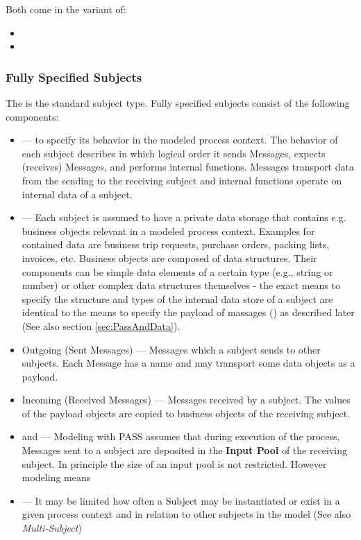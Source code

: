 Both come in the variant of:

\begin{itemize}
    \item {}
	\item {}
\end{itemize}

\subsubsection{Fully Specified Subjects}
\label{sec:fullySpecifiedSubject}

The  is the standard subject type. Fully specified subjects consist of the following components:

\begin{itemize}
    \item {} --- to specify its behavior in the modeled process context. The behavior of each subject describes in which logical order it sends Messages, expects (receives) Messages, and performs internal functions. Messages transport data from the sending to the receiving subject and internal functions operate on internal data of a subject. 
	\item {} --- Each subject is assumed to have a private data storage that contains e.g. business objects relevant in a modeled process context. Examples for contained data are business trip requests, purchase orders, packing lists, invoices, etc. Business objects are composed of data structures. Their components can be simple data elements of a certain type (e.g., string or number) or other complex data structures themselves - the exact means to specify the structure and types of the internal data store of a subject are identical to the means to specify the payload of massages () as described later (See also section \ref{sec:PassAndData}).
	\item Outgoing  (Sent Messages) --- Messages which a subject sends to other subjects. Each Message has a name and may transport some data objects as a payload.
	\item Incoming  (Received Messages) --- Messages received by a subject. The values of the payload objects are copied to business objects of the receiving subject.
	\item {} and  --- Modeling with PASS assumes that during execution of the process, Messages sent to a subject are deposited in the \textbf{Input Pool} of the receiving subject. In principle the size of an input pool is not restricted. However modeling means 
	\item {}  --- It may be limited how often a Subject may be instantiated or exist in a given process context and in relation to other subjects in the model (See also \textit{Multi-Subject})
\end{itemize}

